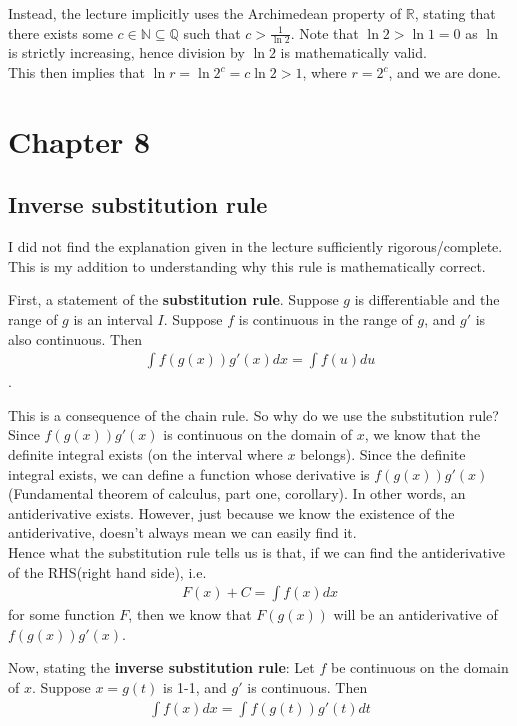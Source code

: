 \documentclass{article}
\begin{document}
Instead, the lecture implicitly uses the Archimedean property of $\mathbb{R}$, stating that there exists some $c\in \mathbb{N}\subseteq \mathbb{Q}$ such that $c>\frac{1}{\ln 2}$. Note that $\ln 2 > \ln 1=0$ as $\ln$ is strictly increasing, hence division by $\ln 2$ is mathematically valid. \\
This then implies that $\ln r = \ln 2^c = c\ln 2>1$, where $r=2^c$, and we are done.



\section{Chapter 8}
\subsection{Inverse substitution rule}
I did not find the explanation given in the lecture sufficiently rigorous/complete. This is my addition to understanding why this rule is mathematically correct.

First, a statement of the \textbf{substitution rule}.
Suppose $g$ is differentiable and the range of $g$ is an interval $I$. Suppose $f$ is continuous in the range of $g$, and $g'$ is also continuous.
Then 
\begin{align*}
    \int f(g(x))g'(x) dx=\int f(u) du
\end{align*}.

This is a consequence of the chain rule.
So why do we use the substitution rule? \\Since $f(g(x))g'(x)$ is continuous on the domain of $x$, we know that the definite integral exists (on the interval where $x$ belongs). Since the definite integral exists, we can define a function whose derivative is $f(g(x))g'(x)$ (Fundamental theorem of calculus, part one, corollary). In other words, an antiderivative exists. However, just because we know the existence of the antiderivative, doesn't always mean we can easily find it.\\
Hence what the substitution rule tells us is that, if we can find the antiderivative of the RHS(right hand side), i.e. 
\begin{align*}
    F(x) + C = \int f(x) dx
\end{align*}
for some function $F$, then we know that $F(g(x))$ will be an antiderivative of $f(g(x))g'(x)$.


Now, stating the \textbf{inverse substitution rule}:
Let $f$ be continuous on the domain of $x$. Suppose $x=g(t)$ is 1-1, and $g'$ is continuous. Then 
\begin{align*}
    \int f(x)dx = \int f(g(t))g'(t)dt
\end{align*}
\end{document}
